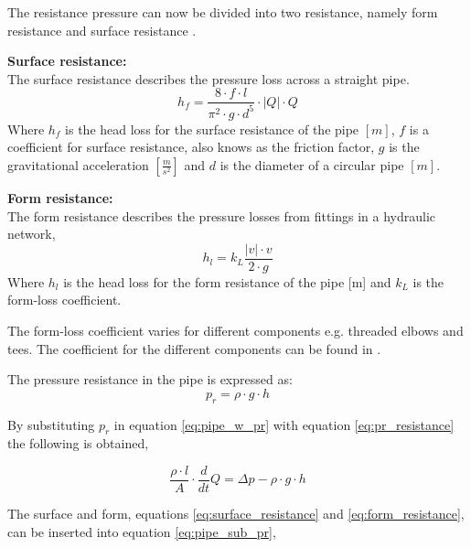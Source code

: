 The resistance pressure can now be divided into two resistance, namely form resistance and surface resistance \cite{swamee_pipe}. 

\textbf{Surface resistance:}\\
The surface resistance describes the pressure loss across a straight pipe.
\begin{equation}\label{eq:surface_resistance}
h_f=\frac{8\cdot f\cdot l}{\pi^2\cdot g\cdot d^5} \cdot |Q|\cdot Q
\end{equation}
Where $h_f$ is the head loss for the surface resistance of the pipe $[m]$, $f$ is a coefficient for surface resistance, also knows as the friction factor, $g$ is the gravitational acceleration $\left[\frac{m}{s^2}\right]$ and $d$ is the diameter of a circular pipe $[m]$.

\textbf{Form resistance:}\\
The form resistance describes the pressure losses from fittings in a hydraulic network, 
\begin{equation} \label{eq:form_resistance}
h_l=k_L \frac{ |v|\cdot v }{2\cdot g}
\end{equation}
Where $h_l$ is the head loss for the form resistance of the pipe [m] and $k_L$ is the form-loss coefficient.

The form-loss coefficient varies for different components e.g. threaded elbows and tees. The coefficient for the different components can be found in \cite{fundamentals_of_fluid_mechanics}. 

The pressure resistance in the pipe is expressed as:
\begin{equation}\label{eq:pr_resistance}
p_r=\rho \cdot g \cdot h 
\end{equation}

By substituting $p_r$ in equation \ref{eq:pipe_w_pr} with equation \ref{eq:pr_resistance} the following is obtained,

\begin{equation} \label{eq:pipe_sub_pr}
\frac{\rho \cdot l}{A}\cdot \frac{d}{dt}Q = \Delta p - \rho \cdot g \cdot h 
\end{equation}

The surface and form, equations \ref{eq:surface_resistance} and \ref{eq:form_resistance}, can be inserted into equation \ref{eq:pipe_sub_pr},



